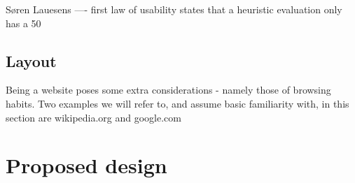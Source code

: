 Søren Lauesens ---- first law of usability states that a heuristic evaluation only has a 50%


\subsection{Layout}
Being a website poses some extra considerations - namely those of browsing habits. Two examples we will refer to, and assume basic familiarity with, in this section are wikipedia.org and google.com


\section{Proposed design}
\label{sec:proposed_design}
